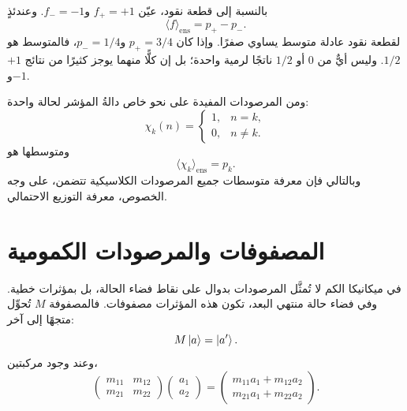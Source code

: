 بالنسبة إلى قطعة نقود، عيّن \(f_+=+1\) و\(f_-=-1\). وعندئذٍ
\begin{equation}
  \langle f\rangle_{\mathrm{ens}}
  =p_+-p_-.
  \label{eq:l02-coin-expectation}
\end{equation}
لقطعة نقود عادلة متوسط يساوي صفرًا. وإذا كان \(p_+=3/4\) و\(p_-=1/4\)، فالمتوسط هو \(1/2\). وليس أيٌّ من \(0\) أو \(1/2\) ناتجًا لرمية واحدة؛ بل إن كلًّا منهما يوجز كثيرًا من نتائج \(+1\) و\(-1\).

\begin{classroomqa}
\end{classroomqa}

ومن المرصودات المفيدة على نحو خاص دالةُ المؤشر لحالة واحدة:
\begin{equation}
  \chi_k(n)=
  \begin{cases}
    1,&n=k,\\
    0,&n\ne k.
  \end{cases}
\end{equation}
ومتوسطها هو
\begin{equation}
  \langle\chi_k\rangle_{\mathrm{ens}}=p_k.
\end{equation}
وبالتالي فإن معرفة متوسطات جميع المرصودات الكلاسيكية تتضمن، على وجه الخصوص، معرفة التوزيع الاحتمالي.

\section{المصفوفات والمرصودات الكمومية}

في ميكانيكا الكم لا تُمثَّل المرصودات بدوال على نقاط فضاء الحالة، بل بمؤثرات خطية. وفي فضاء حالة منتهي البعد، تكون هذه المؤثرات مصفوفات. فالمصفوفة \(M\) تُحوِّل متجهًا إلى آخر:
\begin{equation}
  M\left\lvert a\right\rangle=\left\lvert a'\right\rangle.
  \label{eq:l02-matrix-action}
\end{equation}
وعند وجود مركبتين،
\begin{equation}
  \begin{pmatrix}
    m_{11}&m_{12}\\
    m_{21}&m_{22}
  \end{pmatrix}
  \begin{pmatrix}a_1\\a_2\end{pmatrix}
  =
  \begin{pmatrix}
    m_{11}a_1+m_{12}a_2\\
    m_{21}a_1+m_{22}a_2
  \end{pmatrix}.
  \label{eq:l02-matrix-components}
\end{equation}


